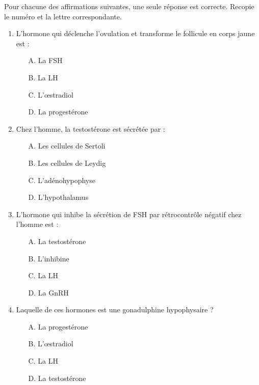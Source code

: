 \documentclass[11pt]{article}
\begin{document}
\begin{exercice}
Pour chacune des affirmations suivantes, une seule réponse est correcte. Recopie le numéro et la lettre correspondante.
\begin{enumerate}
    \item L'hormone qui déclenche l'ovulation et transforme le follicule en corps jaune est :
    \begin{itemize}
        \item[A.] La FSH
        \item[B.] La LH
        \item[C.] L'œstradiol
        \item[D.] La progestérone
    \end{itemize}
    \item Chez l'homme, la testostérone est sécrétée par :
    \begin{itemize}
        \item[A.] Les cellules de Sertoli
        \item[B.] Les cellules de Leydig
        \item[C.] L'adénohypophyse
        \item[D.] L'hypothalamus
    \end{itemize}
    \item L'hormone qui inhibe la sécrétion de FSH par rétrocontrôle négatif chez l'homme est :
    \begin{itemize}
        \item[A.] La testostérone
        \item[B.] L'inhibine
        \item[C.] La LH
        \item[D.] La GnRH
    \end{itemize}
    \item Laquelle de ces hormones est une gonadulphine hypophysaire ?
    \begin{itemize}
        \item[A.] La progestérone
        \item[B.] L'œstradiol
        \item[C.] La LH
        \item[D.] La testostérone
    \end{itemize}
\end{enumerate}
\end{exercice}
\end{document}
